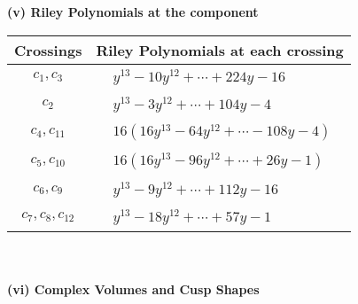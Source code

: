 \documentclass[1p]{elsarticle_modified}
\theoremstyle{definition}
\begin{document}
\flushleft \textbf{(v) Riley Polynomials at the component}\newline \\
\begin{tabular}{m{50pt}|m{274pt}}
Crossings & \hspace{64pt}Riley Polynomials at each crossing \\
\hline $$\begin{aligned}c_{1},c_{3}\end{aligned}$$&$\begin{aligned}
&y^{13}-10 y^{12}+\cdots+224 y-16
\end{aligned}$\\
\hline $$\begin{aligned}c_{2}\end{aligned}$$&$\begin{aligned}
&y^{13}-3 y^{12}+\cdots+104 y-4
\end{aligned}$\\
\hline $$\begin{aligned}c_{4},c_{11}\end{aligned}$$&$\begin{aligned}
&16(16 y^{13}-64 y^{12}+\cdots-108 y-4)
\end{aligned}$\\
\hline $$\begin{aligned}c_{5},c_{10}\end{aligned}$$&$\begin{aligned}
&16(16 y^{13}-96 y^{12}+\cdots+26 y-1)
\end{aligned}$\\
\hline $$\begin{aligned}c_{6},c_{9}\end{aligned}$$&$\begin{aligned}
&y^{13}-9 y^{12}+\cdots+112 y-16
\end{aligned}$\\
\hline $$\begin{aligned}c_{7},c_{8},c_{12}\end{aligned}$$&$\begin{aligned}
&y^{13}-18 y^{12}+\cdots+57 y-1
\end{aligned}$\\
\hline
\end{tabular}\\~\\
\newpage\flushleft \textbf{(vi) Complex Volumes and Cusp Shapes}
\end{document}
